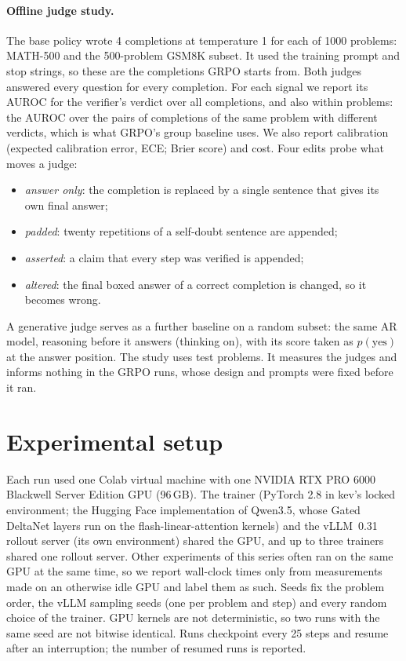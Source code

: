 \paragraph{Offline judge study.} The base policy wrote 4 completions at temperature 1 for each of 1000 problems:
MATH-500 and the 500-problem GSM8K subset. It used the training prompt and stop strings, so these are the completions
GRPO starts from. Both judges answered every question for every completion. For each signal we report its AUROC for
the verifier's verdict over all completions, and also within problems: the AUROC over the pairs of completions of the
same problem with different verdicts, which is what GRPO's group baseline uses. We also report calibration (expected
calibration error, ECE; Brier score) and cost. Four edits probe what moves a judge:
\begin{itemize}
\item \emph{answer only}: the completion is replaced by a single sentence that gives its own final answer;
\item \emph{padded}: twenty repetitions of a self-doubt sentence are appended;
\item \emph{asserted}: a claim that every step was verified is appended;
\item \emph{altered}: the final boxed answer of a correct completion is changed, so it becomes wrong.
\end{itemize}
A generative judge serves as a further baseline on a random subset: the same AR model, reasoning before it answers
(thinking on), with its score taken as $p(\text{yes})$ at the answer position. The study uses test problems. It
measures the judges and informs nothing in the GRPO runs, whose design and prompts were fixed before it ran.

\section{Experimental setup}\label{sec:setup}

Each run used one Colab virtual machine with one NVIDIA RTX PRO 6000 Blackwell Server Edition GPU (96\,GB). The trainer
(PyTorch 2.8 in kev's locked environment; the Hugging Face implementation of Qwen3.5, whose Gated DeltaNet layers run on
the flash-linear-attention kernels) and the vLLM~0.31 rollout server (its own environment) shared the GPU, and up to
three trainers shared one rollout server. Other experiments of this series often ran on the same GPU at the same time, so we
report wall-clock times only from measurements made on an otherwise idle GPU and label them as such. Seeds fix the
problem order, the vLLM sampling seeds (one per problem and step) and every random choice of the trainer. GPU kernels
are not deterministic, so two runs with the same seed are not bitwise identical. Runs checkpoint every 25 steps and
resume after an interruption; the number of resumed runs is reported.
